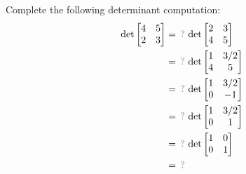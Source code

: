 \begin{applicationActivities}{2}{26}
\begin{activity}{10}
  Complete the following determinant computation:
    \begin{align*}
    \det\begin{bmatrix} 4 & 5 \\ 2 & 3 \end{bmatrix}
  &=
    \unknown
    \det\begin{bmatrix} 2 & 3 \\ 4 & 5 \end{bmatrix}
  \\ &=
    \unknown
    \det\begin{bmatrix} 1 & 3/2 \\ 4 & 5 \end{bmatrix}
  \\ &=
    \unknown
    \det\begin{bmatrix} 1 & 3/2 \\ 0 & -1 \end{bmatrix}
  \\ &=
    \unknown
    \det\begin{bmatrix} 1 & 3/2 \\ 0 & 1 \end{bmatrix}
  \\ &=
    \unknown
    \det\begin{bmatrix} 1 & 0 \\ 0 & 1 \end{bmatrix}
  \\ &=
    \unknown
    \end{align*}
\end{activity}


\end{applicationActivities}
